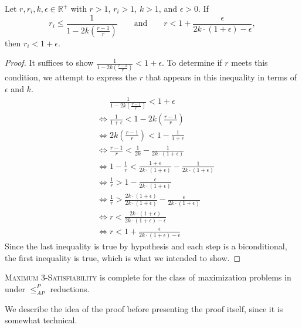 \documentclass[]{article}
\newcommand{\APr}{\leq_{AP}^{P}}
\begin{document}
\begin{lemma}\label{lem:magic}
  Let $r, r_i, k, \epsilon \in \mathbb{R}^+$ with $r > 1$, $r_i > 1$, $k > 1$, and $\epsilon > 0$.
  If
  \begin{equation*}
    r_i \leq \frac{1}{1 - 2k(\frac{r - 1}{r})} \qquad \text{and} \qquad r < 1 + \frac{\epsilon}{2k \cdot (1 + \epsilon) - \epsilon},
  \end{equation*}
  then $r_i < 1 + \epsilon$.
\end{lemma}
\begin{proof}
  It suffices to show $\frac{1}{1 - 2k(\frac{r - 1}{r})} < 1 + \epsilon$. To determine if $r$ meets this condition, we attempt to express the $r$ that appears in this inequality in terms of $\epsilon$ and $k$.
  \begin{align*}
    & \phantom{\iff} \frac{1}{1 - 2k(\frac{r - 1}{r})} < 1 + \epsilon \\
    & \iff \frac{1}{1 + \epsilon} < 1 - 2k(\frac{r - 1}{r}) \\
    & \iff 2k(\frac{r - 1}{r}) < 1 - \frac{1}{1 + \epsilon} \\
    & \iff \frac{r - 1}{r} < \frac{1}{2k} - \frac{1}{2k \cdot (1 + \epsilon)} \\
    & \iff 1 - \frac{1}{r} < \frac{1 + \epsilon}{2k \cdot (1 + \epsilon)} - \frac{1}{2k \cdot (1 + \epsilon)} \\
    & \iff \frac{1}{r} > 1 - \frac{\epsilon}{2k \cdot (1 + \epsilon)} \\
    & \iff \frac{1}{r} > \frac{2k \cdot (1 + \epsilon)}{2k \cdot (1 + \epsilon)} - \frac{\epsilon}{2k \cdot (1 + \epsilon)} \\
    & \iff r < \frac{2k \cdot (1 + \epsilon)}{2k \cdot (1 + \epsilon) - \epsilon} \\
    & \iff r < 1 + \frac{\epsilon}{2k \cdot (1 + \epsilon) - \epsilon}
  \end{align*}
  Since the last inequality is true by hypothesis and each step is a biconditional, the first inequality is true, which is what we intended to show.
\end{proof}

\begin{theorem}\label{thm:maxcomplete}
  \textsc{Maximum 3-Satisfiability} is complete for the class of maximization problems in \APX{} under $\APr$ reductions.
\end{theorem}

We describe the idea of the proof before presenting the proof itself, since it is somewhat technical.
\end{document}
